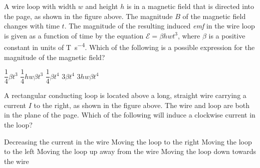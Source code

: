 \documentclass{../../../oss-apphys-exam}
\begin{document}
\begin{questions}
  \question A wire loop with width $w$ and height $h$ is in a magnetic field
  that is directed into the page, as shown in the figure above. The magnitude
  $B$ of the magnetic field changes with time $t$. The magnitude of the
  resulting induced \emph{emf} in the wire loop is given as a function of time
  by the equation $\mathcal E=\beta hwt^3$, where $\beta$ is a positive constant
  in units of \si{\tesla\per\second^4}. Which of the following is a possible
  expression for the magnitude of the magnetic field?
  \begin{choices}
    \choice$\dfrac14\beta t^3$
    \choice$\dfrac14hw\beta t^3$
    \choice$\dfrac14\beta t^4$
    \choice$3\beta t^4$
    \choice$3hw\beta t^4$
  \end{choices}
  
  \question A rectangular conducting loop is located above a long, straight
  wire carrying a current $I$ to the right, as shown in the figure above. The
  wire and loop are both in the plane of the page. Which of the following will
  induce a clockwise current in the loop?
  \begin{choices}
    \choice Decreasing the current in the wire
    \choice Moving the loop to the right
    \choice Moving the loop to the left
    \choice Moving the loop up away from the wire
    \choice Moving the loop down towards the wire
  \end{choices}
  

\end{questions}
\end{document}
